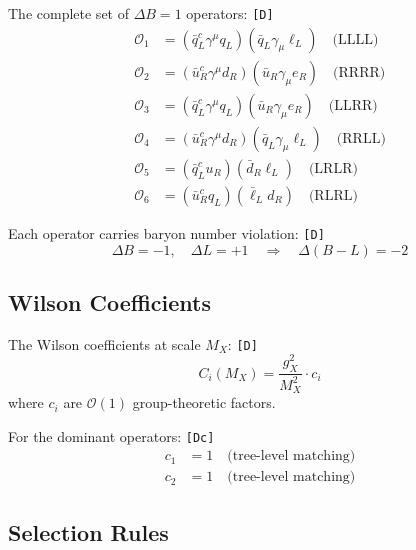 \documentclass[11pt,a4paper]{article}
\newcommand{\tagD}{\textcolor{green!50!black}{\texttt{[D]}}}
\newcommand{\tagDc}{\textcolor{blue!70!black}{\texttt{[Dc]}}}
\theoremstyle{definition}
\begin{document}
\begin{derivbox}
The complete set of $\Delta B = 1$ operators: \tagD{}
\begin{align}
\label{eq:O1-LLLL}
\mathcal{O}_1 &= (\bar{q}_L^c \gamma^\mu q_L)(\bar{q}_L \gamma_\mu \ell_L) \quad \text{(LLLL)} \\
\label{eq:O2-RRRR}
\mathcal{O}_2 &= (\bar{u}_R^c \gamma^\mu d_R)(\bar{u}_R \gamma_\mu e_R) \quad \text{(RRRR)} \\
\label{eq:O3-LLRR}
\mathcal{O}_3 &= (\bar{q}_L^c \gamma^\mu q_L)(\bar{u}_R \gamma_\mu e_R) \quad \text{(LLRR)} \\
\label{eq:O4-RRLL}
\mathcal{O}_4 &= (\bar{u}_R^c \gamma^\mu d_R)(\bar{q}_L \gamma_\mu \ell_L) \quad \text{(RRLL)} \\
\label{eq:O5-LRLR}
\mathcal{O}_5 &= (\bar{q}_L^c u_R)(\bar{d}_R \ell_L) \quad \text{(LRLR)} \\
\label{eq:O6-RLRL}
\mathcal{O}_6 &= (\bar{u}_R^c q_L)(\bar{\ell}_L d_R) \quad \text{(RLRL)}
\end{align}

Each operator carries baryon number violation: \tagD{}
\begin{equation}
\label{eq:delta-B}
\Delta B = -1, \quad \Delta L = +1 \quad \Rightarrow \quad \Delta(B-L) = -2
\end{equation}
\end{derivbox}

\subsection{Wilson Coefficients}
\label{subsec:wilson-coefficients}

The Wilson coefficients at scale $M_X$: \tagD{}
\begin{equation}
\label{eq:wilson-at-mx}
C_i(M_X) = \frac{g_X^2}{M_X^2} \cdot c_i
\end{equation}
where $c_i$ are $\mathcal{O}(1)$ group-theoretic factors.

For the dominant operators: \tagDc{}
\begin{align}
\label{eq:c1-value}
c_1 &= 1 \quad \text{(tree-level matching)} \\
\label{eq:c2-value}
c_2 &= 1 \quad \text{(tree-level matching)}
\end{align}

\subsection{Selection Rules}
\label{subsec:selection-rules}
\end{document}
